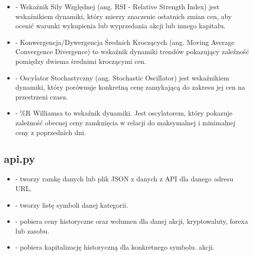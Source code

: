 \documentclass[12pt]{article}
\begin{document}
\begin{itemize}
			\item {} - Wskaźnik Siły Względnej (ang. RSI - Relative Strength Index) jest wskaźnikiem
			dynamiki, który mierzy znaczenie ostatnich zmian cen, aby ocenić warunki wykupienia lub wyprzedania
			akcji lub innego kapitału.
			\item {} - Konwergencja/Dywergencja Średnich Kroczących (ang. Moving Average Convergence Divergence)
			to wskaźnik dynamiki trendów pokazujący zaleźność pomiędzy dwiema średnimi kroczącymi cen.
			\item {} - Oscylator Stochastyczny (ang. Stochastic Oscillator) jest wskaźnikiem dynamiki,
			który porównuje konkretną cenę zamykającą do zakresu jej cen na przestrzeni czasu.
			\item {} - \%R Williamsa to wskaźnik dynamiki. Jest oscylatorem, który pokazuje zależność obecnej
			ceny zamknięcia w relacji do maksymalnej i minimalnej ceny z poprzednich dni.
		\end{itemize}
		\subsection{api.py}
			\begin{itemize}
				\item {} - tworzy ramkę danych lub plik JSON z danych z API dla danego adresu URL.
				\item {} - tworzy listę symboli danej kategorii.
				\item {} - pobiera ceny historyczne oraz wolumen dla danej akcji, kryptowaluty, forexa lub zasobu.
				\item {} - pobiera kapitalizację historyczną dla konkretnego symbolu.
				akcji.
			\end{itemize}

\newpage
\end{document}
